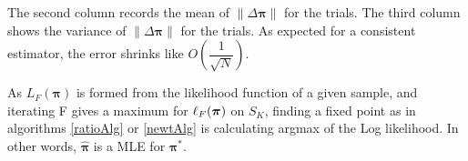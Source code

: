 The second column records the mean of $\|\Delta\bm\pi\|$ for the trials. The third column shows the variance of $\|\Delta\bm\pi\|$ for the trials.  As expected for a consistent estimator, the error shrinks like $O\left(\dfrac{1}{\sqrt{N}}\right)$.


As \( L_F(\bm\pi) \) is formed from the likelihood function of a given sample, and iterating \Rpi F gives a maximum for \( \ell_{F}({\bm\pi}) \) on \( S_K \), finding a fixed point as in algorithms \ref{ratioAlg} or \ref{newtAlg} is calculating argmax of the Log likelihood.  In other words, \( \hat{\bm\pi} \) is a MLE for \( \bm\pi^{\ast} \).